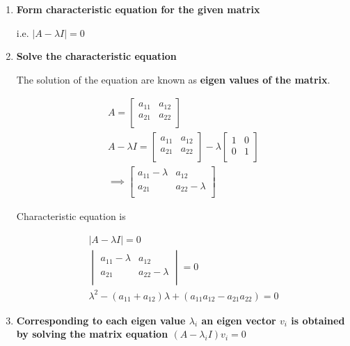 \documentclass[english,course,fleqn]{lecture}
\begin{document}
\begin{enumerate}
  \item \textbf{Form characteristic equation for the given matrix}

    i.e. $|A-\lambda I| = 0$ 


  \item \textbf{Solve the characteristic equation}

    The solution of the equation are known as \textbf{eigen values of the matrix}.

    \begin{gather*}
      A = \begin{bmatrix}
        a_{11} & a_{12} \\
        a_{21} & a_{22} \\
      \end{bmatrix}\\
      A - \lambda I =  \begin{bmatrix}
        a_{11} & a_{12} \\
        a_{21} & a_{22} \\
        \end{bmatrix} - \lambda \begin{bmatrix}
        1 & 0 \\
        0 & 1 \\
      \end{bmatrix}\\
      \implies \begin{bmatrix}
        a_{11} - \lambda & a_{12} \\
        a_{21} & a_{22} - \lambda \\
      \end{bmatrix}
    \end{gather*}

    Characteristic equation is

    \begin{gather*}
      |A - \lambda I| = 0\\
      \begin{vmatrix}
        a_{11} - \lambda & a_{12} \\
        a_{21} & a_{22} - \lambda \\
      \end{vmatrix} = 0\\
      \lambda^{2} - (a_{11} + a_{12})\lambda + (a_{11}a_{12} - a_{21} a _{22}) = 0
    \end{gather*}

  \item \textbf{Corresponding to each eigen value $\lambda_{i}$ an eigen vector $v_{i}$ is obtained by solving the matrix equation $(A - \lambda_{i}I) v_{i} = 0$}
\end{enumerate}
\end{document}
